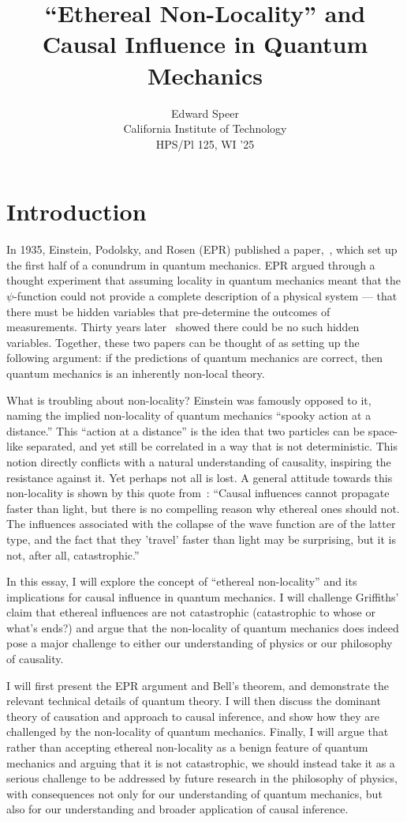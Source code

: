 \documentclass[11pt, a4paper]{article}
\title{``Ethereal Non-Locality'' and Causal Influence in Quantum Mechanics}
\author{%
  Edward Speer
  \\
  California Institute of Technology\\
  HPS/Pl 125, WI '25 \\
}
\date{\monthyeardate}
\begin{document}
\maketitle

\section{Introduction}
In 1935, Einstein, Podolsky, and Rosen (EPR) published a paper,~\cite{EPR_1935},
which set up the first half of a conundrum in quantum mechanics. EPR argued
through a thought experiment that assuming locality in quantum mechanics meant 
that the $\psi$-function could not provide a complete description of a physical
system — that there must be hidden variables that pre-determine the outcomes of
measurements. Thirty years later~\cite{Bell_1964} showed there could be no such
hidden variables. Together, these two papers can be thought of as setting up the
following argument: if the predictions of quantum mechanics are correct, then
quantum mechanics is an inherently non-local theory. 

What is troubling about non-locality? Einstein was famously opposed to it,
naming the implied non-locality of quantum mechanics ``spooky action at a
distance.'' This ``action at a distance'' is the idea that two particles can be
space-like separated, and yet still be correlated in a way that is not
deterministic. This notion directly conflicts with a natural understanding of
causality, inspiring the resistance against it. Yet perhaps not all is lost. 
A general attitude towards this non-locality is shown by this quote
from~\cite{Griffiths_2020}: ``Causal influences cannot propagate faster than
light, but there is no compelling reason why ethereal ones should not. The 
influences associated with the collapse of the wave function are of the latter
type, and the fact that they 'travel' faster than light may be surprising, but
it is not, after all, catastrophic.''

In this essay, I will explore the concept of ``ethereal non-locality'' and its
implications for causal influence in quantum mechanics. I will challenge 
Griffiths' claim that ethereal influences are not catastrophic (catastrophic to
whose or what's ends?) and argue that the non-locality of quantum mechanics does 
indeed pose a major challenge to either our understanding of physics or our
philosophy of causality.

I will first present the EPR argument and Bell's theorem, and demonstrate the 
relevant technical details of quantum theory. I will then discuss the dominant
theory of causation and approach to causal inference, and show how they are
challenged by the non-locality of quantum mechanics. Finally, I will argue that
rather than accepting ethereal non-locality as a benign feature of quantum
mechanics and arguing that it is not catastrophic, we should instead take it as
a serious challenge to be addressed by future research in the philosophy of
physics, with consequences not only for our understanding of quantum mechanics,
but also for our understanding and broader application of causal inference.
\end{document}

